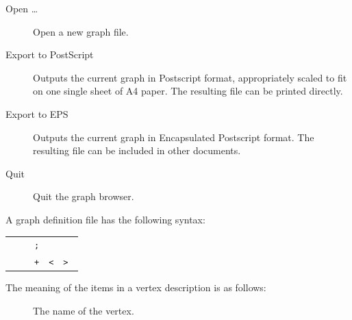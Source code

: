 \begin{isabellebody}
\begin{isamarkuptext}
  \begin{description}
  
  \item[Open \dots] Open a new graph file.
  
  \item[Export to PostScript] Outputs the current graph in Postscript
  format, appropriately scaled to fit on one single sheet of A4 paper.
  The resulting file can be printed directly.
  
  \item[Export to EPS] Outputs the current graph in Encapsulated
  Postscript format. The resulting file can be included in other
  documents.

  \item[Quit] Quit the graph browser.

  \end{description}%
\end{isamarkuptext}%
\isamarkuptrue%
%
\isamarkuptrue%
%
\begin{isamarkuptext}%
A graph definition file has the following syntax:

  \begin{tabular}{rcl}
    \isa{graph} & \isa{{\isachardoublequote}{\isacharequal}{\isachardoublequote}} & \isa{{\isachardoublequote}{\isacharbraceleft}\ vertex{\isachardoublequote}}~\verb|;|~\isa{{\isachardoublequote}{\isacharbraceright}\isactrlsup {\isacharplus}{\isachardoublequote}} \\
    \isa{vertex} & \isa{{\isachardoublequote}{\isacharequal}{\isachardoublequote}} & \isa{{\isachardoublequote}vertex{\isacharunderscore}name\ vertex{\isacharunderscore}ID\ dir{\isacharunderscore}name\ {\isacharbrackleft}{\isachardoublequote}}~\verb|+|~\isa{{\isachardoublequote}{\isacharbrackright}\ path\ {\isacharbrackleft}{\isachardoublequote}}~\verb|<|~\isa{{\isachardoublequote}{\isacharbar}{\isachardoublequote}}~\verb|>|~\isa{{\isachardoublequote}{\isacharbrackright}\ {\isacharbraceleft}\ vertex{\isacharunderscore}ID\ {\isacharbraceright}\isactrlsup {\isacharasterisk}{\isachardoublequote}}
  \end{tabular}

  The meaning of the items in a vertex description is as follows:

  \begin{description}
  
  \item[] The name of the vertex.
  

\end{description}
\end{isamarkuptext}
\end{isabellebody}
